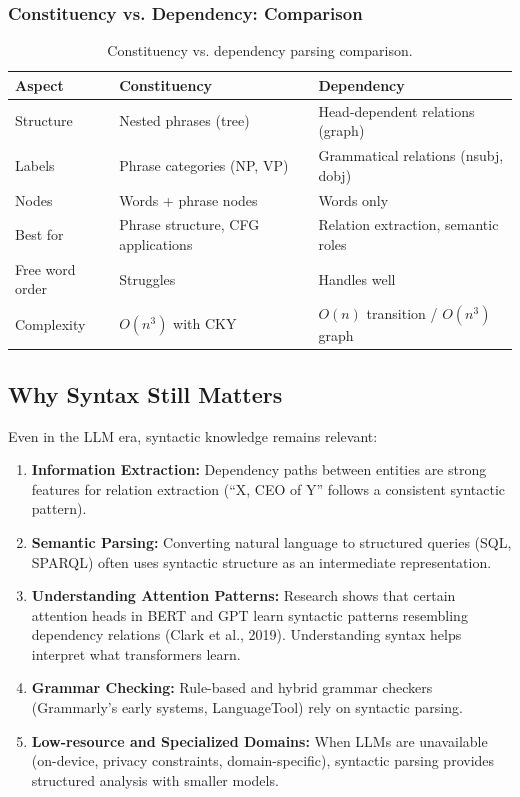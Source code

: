 \subsubsection{Constituency vs. Dependency: Comparison}

\begin{table}[H]
\centering
\caption{Constituency vs. dependency parsing comparison.}
\label{tab:parsing_comparison}
\small
\begin{tabular}{@{}lll@{}}
\toprule
\textbf{Aspect} & \textbf{Constituency} & \textbf{Dependency} \\
\midrule
Structure & Nested phrases (tree) & Head-dependent relations (graph) \\
Labels & Phrase categories (NP, VP) & Grammatical relations (nsubj, dobj) \\
Nodes & Words + phrase nodes & Words only \\
Best for & Phrase structure, CFG applications & Relation extraction, semantic roles \\
Free word order & Struggles & Handles well \\
Complexity & $O(n^3)$ with CKY & $O(n)$ transition / $O(n^3)$ graph \\
\bottomrule
\end{tabular}
\end{table}

\subsection{Why Syntax Still Matters}
\label{sec:why_syntax}

Even in the LLM era, syntactic knowledge remains relevant:

\begin{enumerate}
    \item \textbf{Information Extraction:} Dependency paths between entities are strong
    features for relation extraction (``X, CEO of Y'' follows a consistent syntactic
    pattern).
    \item \textbf{Semantic Parsing:} Converting natural language to structured queries
    (SQL, SPARQL) often uses syntactic structure as an intermediate representation.
    \item \textbf{Understanding Attention Patterns:} Research shows that certain attention
    heads in BERT and GPT learn syntactic patterns resembling dependency relations
    (Clark et al., 2019). Understanding syntax helps interpret what transformers learn.
    \item \textbf{Grammar Checking:} Rule-based and hybrid grammar checkers (Grammarly's
    early systems, LanguageTool) rely on syntactic parsing.
    \item \textbf{Low-resource and Specialized Domains:} When LLMs are unavailable
    (on-device, privacy constraints, domain-specific), syntactic parsing provides
    structured analysis with smaller models.
\end{enumerate}

